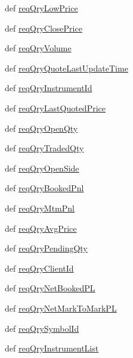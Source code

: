 \begin{DoxyCompactItemize}
def \hyperlink{classmuTradePyBase_1_1CustomStrategy_aaa79b2efd9d3edba03a3eccff9e59c18}{reqQryLowPrice}
\item 
def \hyperlink{classmuTradePyBase_1_1CustomStrategy_ad402881274c2432ec5018c2e3da3c6cf}{reqQryClosePrice}
\item 
def \hyperlink{classmuTradePyBase_1_1CustomStrategy_a45942a08cd5fd7cd63ca6873786e2249}{reqQryVolume}
\item 
def \hyperlink{classmuTradePyBase_1_1CustomStrategy_a7cc21237ff1f78abaa29a1c87adc8f7c}{reqQryQuoteLastUpdateTime}
\item 
def \hyperlink{classmuTradePyBase_1_1CustomStrategy_a3828d43f41c88b74b14b920f29f96f9b}{reqQryInstrumentId}
\item 
def \hyperlink{classmuTradePyBase_1_1CustomStrategy_a58823e909645a91e0c35d8a71cc947e5}{reqQryLastQuotedPrice}
\item 
def \hyperlink{classmuTradePyBase_1_1CustomStrategy_a44a5e9d557e3de1f6cc1ba7f1b192e40}{reqQryOpenQty}
\item 
def \hyperlink{classmuTradePyBase_1_1CustomStrategy_a4f5ff1338b2dab2bd1fc6a6262eda68b}{reqQryTradedQty}
\item 
def \hyperlink{classmuTradePyBase_1_1CustomStrategy_afa2494957cf0c4cc62ae833c6f293654}{reqQryOpenSide}
\item 
def \hyperlink{classmuTradePyBase_1_1CustomStrategy_a833fe1cfaf064a995fd4caa2cdc32683}{reqQryBookedPnl}
\item 
def \hyperlink{classmuTradePyBase_1_1CustomStrategy_a72d97c769d9d74c968e20ef5208b86e1}{reqQryMtmPnl}
\item 
def \hyperlink{classmuTradePyBase_1_1CustomStrategy_a831e1208c1c70bd5a6d461156aa9a77a}{reqQryAvgPrice}
\item 
def \hyperlink{classmuTradePyBase_1_1CustomStrategy_a58d72b142c0336af5b6e569f3ed500c4}{reqQryPendingQty}
\item 
def \hyperlink{classmuTradePyBase_1_1CustomStrategy_aaa13aee1b0102ed8d6d5c78d18bed8cc}{reqQryClientId}
\item 
def \hyperlink{classmuTradePyBase_1_1CustomStrategy_ab2bb976f03464a96a1eaad71384988c8}{reqQryNetBookedPL}
\item 
def \hyperlink{classmuTradePyBase_1_1CustomStrategy_af22277e5d655d83298baff704eb15c20}{reqQryNetMarkToMarkPL}
\item 
def \hyperlink{classmuTradePyBase_1_1CustomStrategy_affe1610052e184d5501345f1a3f14169}{reqQrySymbolId}
\item 
def \hyperlink{classmuTradePyBase_1_1CustomStrategy_a1bfe7ef1cd4ad2b136eb2e7bb97005a5}{reqQryInstrumentList}

\end{DoxyCompactItemize}
